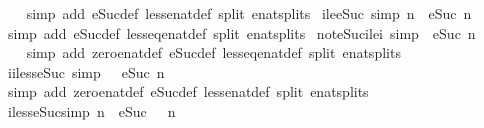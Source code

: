 \begin{isabellebody}
%
\isadelimproof
\ \ %
\endisadelimproof
%
\isatagproof
{}\isamarkupfalse%
\ {\isacharparenleft}simp\ add{\isacharcolon}\ eSuc{\isacharunderscore}def\ less{\isacharunderscore}enat{\isacharunderscore}def\ split{\isacharcolon}\ enat{\isachardot}splits{\isacharparenright}%
\endisatagproof
{\isafoldproof}%
%
\isadelimproof
\isanewline
%
\endisadelimproof
\isanewline
{}\isamarkupfalse%
\ ile{\isacharunderscore}eSuc\ {\isacharbrackleft}simp{\isacharbrackright}{\isacharcolon}\ {\isachardoublequoteopen}n\ {\isasymle}\ eSuc\ n{\isachardoublequoteclose}\isanewline
%
\isadelimproof
\ \ %
\endisadelimproof
%
\isatagproof
{}\isamarkupfalse%
\ {\isacharparenleft}simp\ add{\isacharcolon}\ eSuc{\isacharunderscore}def\ less{\isacharunderscore}eq{\isacharunderscore}enat{\isacharunderscore}def\ split{\isacharcolon}\ enat{\isachardot}splits{\isacharparenright}%
\endisatagproof
{\isafoldproof}%
%
\isadelimproof
\isanewline
%
\endisadelimproof
\isanewline
{}\isamarkupfalse%
\ not{\isacharunderscore}eSuc{\isacharunderscore}ilei{}\ {\isacharbrackleft}simp{\isacharbrackright}{\isacharcolon}\ {\isachardoublequoteopen}{\isasymnot}\ eSuc\ n\ {\isasymle}\ {}{\isachardoublequoteclose}\isanewline
%
\isadelimproof
\ \ %
\endisadelimproof
%
\isatagproof
{}\isamarkupfalse%
\ {\isacharparenleft}simp\ add{\isacharcolon}\ zero{\isacharunderscore}enat{\isacharunderscore}def\ eSuc{\isacharunderscore}def\ less{\isacharunderscore}eq{\isacharunderscore}enat{\isacharunderscore}def\ split{\isacharcolon}\ enat{\isachardot}splits{\isacharparenright}%
\endisatagproof
{\isafoldproof}%
%
\isadelimproof
\isanewline
%
\endisadelimproof
\isanewline
{}\isamarkupfalse%
\ i{}{\isacharunderscore}iless{\isacharunderscore}eSuc\ {\isacharbrackleft}simp{\isacharbrackright}{\isacharcolon}\ {\isachardoublequoteopen}{}\ {\isacharless}\ eSuc\ n{\isachardoublequoteclose}\isanewline
%
\isadelimproof
\ \ %
\endisadelimproof
%
\isatagproof
{}\isamarkupfalse%
\ {\isacharparenleft}simp\ add{\isacharcolon}\ zero{\isacharunderscore}enat{\isacharunderscore}def\ eSuc{\isacharunderscore}def\ less{\isacharunderscore}enat{\isacharunderscore}def\ split{\isacharcolon}\ enat{\isachardot}splits{\isacharparenright}%
\endisatagproof
{\isafoldproof}%
%
\isadelimproof
\isanewline
%
\endisadelimproof
\isanewline
{}\isamarkupfalse%
\ iless{\isacharunderscore}eSuc{}{\isacharbrackleft}simp{\isacharbrackright}{\isacharcolon}\ {\isachardoublequoteopen}{\isacharparenleft}n\ {\isacharless}\ eSuc\ {}{\isacharparenright}\ {\isacharequal}\ {\isacharparenleft}n\ {\isacharequal}\ {}{\isacharparenright}{\isachardoublequoteclose}\isanewline

\end{isabellebody}
